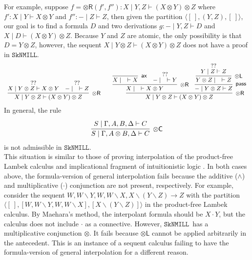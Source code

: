 \documentclass[sn-mathphys-num]{sn-jnl}%
\newcommand{\GG}{\Gamma}
\newcommand{\GD}{\Delta}
\newcommand{\vd}{\vdash}
\newcommand{\tl}{\otimes \mathsf{L}}
\newcommand{\tr}{\otimes\mathsf{R}}
\newcommand{\pass}{\mathsf{pass}}
\newcommand{\ax}{\mathsf{ax}}
\newcommand{\ot}{\otimes}
\newcommand{\bsls}{\backslash}
\newcommand{\SkNMILL}{$\mathtt{SkNMILL}$}
\newcommand{\mf}[1]{\mathsf{#1}}
\theoremstyle{thmstyleone}%
\theoremstyle{thmstyletwo}%
\theoremstyle{thmstylethree}%
\begin{document}
For example, suppose $f = \tr (f',f''): X \mid Y, Z \vd (X\ot Y)\ot Z$ where $f':X \mid Y \vd X\ot Y$ and $f'': {-} \mid Z \vd Z$, then given the partition $\langle [\ ], (Y,Z), [\ ]\rangle$, our goal is to find a formula $D$ and two derivations $g: {-} \mid Y, Z \vd D$ and $X \mid D \vd (X\ot Y)\ot Z$.
Because $Y$ and $Z$ are atomic, the only possibility is that $D = Y \ot Z$, however, the sequent $X \mid Y \ot Z \vd (X \ot Y) \ot Z$ does not have a proof in \SkNMILL.
\begin{equation*}\label{example:ccut:failure}
  \small\begin{array}{c}
    \infer[\tr]{X \mid Y \ot Z \vd (X \ot Y) \ot Z}{
    \deduce{X \mid Y\ot Z \vd X \ot Y}{??}
    &
    \deduce{{-} \mid \quad \vd Z}{??}
  }
  \qquad
  \infer[\tr]{X \mid Y \ot Z \vd (X \ot Y) \ot Z}{
    \infer[\tr]{X \mid \quad \vd X \ot Y}{
      \infer[\ax]{X \mid \quad \vd X}{}
      &
      \deduce{{-} \mid \quad \vd Y}{??}
    }
    &
    \infer[\pass]{{-} \mid Y \ot Z \vd Z}{
      \infer[\tl]{Y \ot Z \mid \quad \vd Z}{
        \deduce{Y \mid Z \vd Z}{??}
      }
    }
  }
  \end{array}
\end{equation*}
In general, the rule
\begin{displaymath}
\begin{array}{c}
  \infer[\ot\mf{C}]{S \mid \GG , A \ot B , \GD \vd C}{
    \deduce{S \mid \GG, A , B , \GD \vd C}{}
  }
\end{array}
\end{displaymath}
is not admissible in \SkNMILL.
\\
This situation is similar to those of proving interpolation of the product-free Lambek calculus \cite{Pentus1997} and implicational fragment of intuitionistic logic \cite{Kanazawa2006}.
In both cases above, the formula-version of general interpolation fails  because the additive ($\land$) and multiplicative ($\cdot$) conjunction are not present, respectively.
For example, consider the sequent $W, W\bsls Y, W , W \bsls X , X \bsls (Y \bsls Z) \longrightarrow Z $ with the partition $\langle [\ ] , [W, W\bsls Y, W , W \bsls X], [X \bsls (Y \bsls Z)] \rangle$ in the product-free Lambek calculus.
By Maehara's method, the interpolant formula should be $X \cdot Y$, but the calculus does not include $\cdot$ as a connective.
However, \SkNMILL~has a multiplicative conjunction $\ot$.
It fails because $\tl$ cannot be applied arbitrarily in the antecedent.
This is an instance of a sequent calculus failing to have the formula-version of general interpolation for a different reason.
\end{document}
